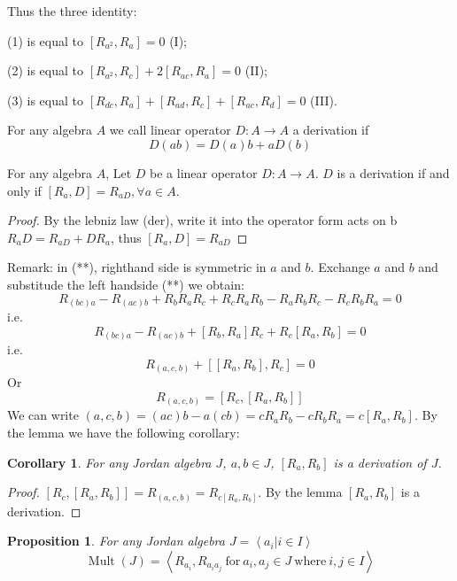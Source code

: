 \documentclass{article}
\newtheorem{proposition}[theorem]{Proposition}
\newtheorem{corollary}[theorem]{Corollary}
\def\<{\mathop{\langle}}
\def\>{\mathop{\rangle}}
\begin{document}
Thus the three identity:

(1) is equal to $ [R_{a^2},R_a] =0$ (I);

(2) is equal to $ [R_{a^2},R_c] +2[R_{ac},R_a]=0$ (II);

(3) is equal to $[R_{dc},R_a]+ [R_{ad},R_c]+[R_{ac},R_d]=0$ (III).

\begin{definition} 
For any algebra $ A $ we call linear operator $ D: A \rightarrow A $ a derivation if 
\begin{equation}
D(ab)=D(a)b+aD(b) \tag{der}
\end{equation}
\end{definition}

\begin{lemma} 
For any algebra $ A $, Let $ D $ be a linear operator $ D: A\rightarrow A $. $ D $ is a derivation if and only if $[R_a,D]=R_{aD}, \forall a \in A$. 
\end{lemma}

\begin{proof} 
By the lebniz law (der), write it into the operator form acts on b $R_aD=R_{aD}+DR_a $, thus $ [R_a,D]=R_{aD} $  
\end{proof}

Remark: in (**), righthand side is symmetric in $ a $ and $ b $. Exchange $ a $ and $ b $ and substitude the left handside (**) we obtain:
\[
R_{(bc)a}-R_{(ac)b}+R_bR_aR_c+R_cR_aR_b-R_aR_bR_c-R_cR_bR_a=0
\]
i.e.
\[
R_{(bc)a}-R_{(ac)b}+[R_b,R_a]R_c+R_c[R_a,R_b]=0
\]
i.e.
\[
R_{(a,c,b)}+[[R_a,R_b],R_c]=0
\]
Or
\[
R_{(a,c,b)}=[R_c,[R_a,R_b]] \tag{IV}
\]
We can write $ (a,c,b)=(ac)b-a(cb)=cR_aR_b-cR_bR_a=c[R_a,R_b]$. By the lemma we have the following corollary:

\begin{corollary}
For any Jordan algebra $ J $, $ a,b \in J $, $ [R_a,R_b] $ is a derivation of $ J $. 
\end{corollary}

\begin{proof} 
$ [R_c,[R_a,R_b]]=R_{(a,c,b)}=R_{c[R_a,R_b]} $. By the lemma $ [R_a,R_b] $ is a derivation.
\end{proof}

\begin{proposition}
For any Jordan algebra $ J=\<a_i | i \in I \> $ 
\[
\operatorname{Mult}(J)=\<R_{a_i}, R_{a_i a_j} \ \text{for} \ a_i, a_j \in J \ \text{where} \ i,j \in I \>
\]
\end{proposition}
\end{document}

